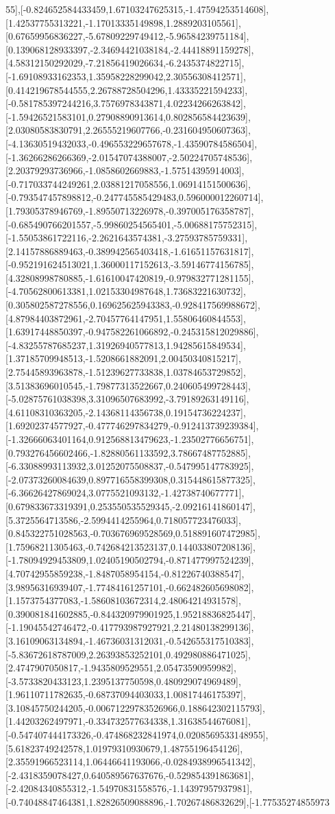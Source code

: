 \documentclass{article}
\begin{document}
55],[-0.824652584433459,1.67103247625315,-1.47594253514608],[1.42537755313221,-1.17013335149898,1.2889203105561],[0.67659956836227,-5.67809229749412,-5.96584239751184],[0.139068128933397,-2.34694421038184,-2.44418891159278],[4.58312150292029,-7.21856419026634,-6.2435374822715],[-1.69108933162353,1.35958228299042,2.30556308412571],[0.414219678544555,2.26788728504296,1.43335221594233],[-0.581785397244216,3.7576978343871,4.02234266263842],[-1.59426521583101,0.27908890913614,0.802856584423639],[2.03080583830791,2.26555219607766,-0.231604950607363],[-4.13630519432033,-0.496553229657678,-1.43590784586504],[-1.36266286266369,-2.01547074388007,-2.50224705748536],[2.20379293736966,-1.0858602669883,-1.57514395914003],[-0.717033744249261,2.03881217058556,1.06914151500636],[-0.793547457898812,-0.247745585429483,0.596000012260714],[1.79305378946769,-1.89550713226978,-0.397005176358787],[-0.685490766201557,-5.99860254565401,-5.00688175752315],[-1.55053861722116,-2.2621643574381,-3.27593785759331],[2.14157886889463,-0.389942565403418,-1.61651157631817],[-0.952191624513021,1.36000117152613,-3.59146774156785],[4.32808998780885,-1.61610047420819,-0.979832771281155],[-4.70562800613381,1.02153304987648,1.73683221630732],[0.305802587278556,0.169625625943383,-0.928417569988672],[4.87984403872961,-2.70457764147951,1.55806460844553],[1.63917448850397,-0.947582261066892,-0.245315812029886],[-4.83255787685237,1.31926940577813,1.94285615849534],[1.37185709948513,-1.5208661882091,2.00450340815217],[2.75445893963878,-1.51239627733838,1.03784653729852],[3.51383696010545,-1.79877313522667,0.240605499728443],[-5.02875761038398,3.31096507683992,-3.79189263149116],[4.61108310363205,-2.14368114356738,0.19154736224237],[1.69202374577927,-0.477746297834279,-0.912413739239384],[-1.32666063401164,0.912568813479623,-1.23502776656751],[0.793276456602466,-1.82880561133592,3.78667487752885],[-6.33088993113932,3.01252075508837,-0.547995147783925],[-2.07373260084639,0.897716558399308,0.315448615877325],[-6.36626427869024,3.0775521093132,-1.42738740677771],[0.679833673319391,0.253550535529345,-2.09216141860147],[5.3725564713586,-2.5994414255964,0.718057723476033],[0.845322751028563,-0.703676969528569,0.518891607472985],[1.75968211305463,-0.742684213523137,0.144033807208136],[-1.78094929453809,1.02405190502794,-0.871477997524239],[4.70742955859238,-1.8487058954154,-0.81226740388547],[3.98956316939407,-1.77484161257101,-0.662482605698082],[1.1573754377083,-1.58608103672314,2.48064214931578],[0.390081841602885,-0.844320979901925,1.95218836825447],[-1.19045542746472,-0.417793987927921,2.21480138299136],[3.16109063134894,-1.46736031312031,-0.542655317510383],[-5.83672618787009,2.26393853252101,0.492980886471025],[2.4747907050817,-1.9435809529551,2.05473590959982],[-3.5733820433123,1.2395137750598,0.480929074969489],[1.96110711782635,-0.68737094403033,1.00817446175397],[3.10845750244205,-0.00671229783526966,0.188642302115793],[1.44203262497971,-0.334732577634338,1.31638544676081],[-0.547407444173326,-0.474868232841974,0.0208569533148955],[5.61823749242578,1.01979310930679,1.48755196454126],[2.35591966523114,1.06446641193066,-0.0284938996541342],[-2.4318359078427,0.640589567637676,-0.529854391863681],[-2.42084340855312,-1.54970831558576,-1.14397957937981],[-0.74048847464381,1.82826509088896,-1.70267486832629],[-1.77535274855973
\end{document}
